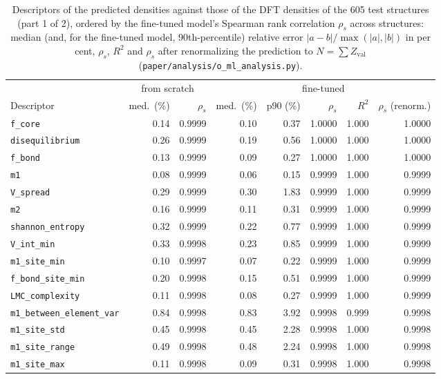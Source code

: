 \begin{table}[p]
\centering
\caption{Descriptors of the predicted densities against those of the DFT densities of the 605 test structures (part 1 of 2), ordered by the fine-tuned model's Spearman rank correlation $\rho_s$ across structures: median (and, for the fine-tuned model, 90th-percentile) relative error $|a-b|/\max(|a|,|b|)$ in per cent, $\rho_s$, $R^2$ and $\rho_s$ after renormalizing the prediction to $N=\sum Z_{\mathrm{val}}$ (\texttt{paper/analysis/o\_ml\_analysis.py}).}
\label{tab:si-ml}
\scriptsize
\begin{tabular}{lrrrrrrr}
\toprule
 & \multicolumn{2}{c}{from scratch} & \multicolumn{5}{c}{fine-tuned} \\
Descriptor & med.\ (\%) & $\rho_s$ & med.\ (\%) & p90 (\%) & $\rho_s$ & $R^2$ & $\rho_s$ (renorm.) \\
\midrule
\texttt{f\_core} & 0.14 & 0.9999 & 0.10 & 0.37 & 1.0000 & 1.000 & 1.0000 \\
\texttt{disequilibrium} & 0.26 & 0.9999 & 0.19 & 0.56 & 1.0000 & 1.000 & 1.0000 \\
\texttt{f\_bond} & 0.13 & 0.9999 & 0.09 & 0.27 & 1.0000 & 1.000 & 1.0000 \\
\texttt{m1} & 0.08 & 0.9999 & 0.06 & 0.15 & 0.9999 & 1.000 & 0.9999 \\
\texttt{V\_spread} & 0.29 & 0.9999 & 0.30 & 1.83 & 0.9999 & 1.000 & 0.9999 \\
\texttt{m2} & 0.16 & 0.9999 & 0.11 & 0.31 & 0.9999 & 1.000 & 0.9999 \\
\texttt{shannon\_entropy} & 0.32 & 0.9999 & 0.22 & 0.77 & 0.9999 & 1.000 & 0.9999 \\
\texttt{V\_int\_min} & 0.33 & 0.9998 & 0.23 & 0.85 & 0.9999 & 1.000 & 0.9999 \\
\texttt{m1\_site\_min} & 0.10 & 0.9997 & 0.07 & 0.22 & 0.9999 & 1.000 & 0.9999 \\
\texttt{f\_bond\_site\_min} & 0.20 & 0.9998 & 0.15 & 0.51 & 0.9999 & 1.000 & 0.9999 \\
\texttt{LMC\_complexity} & 0.11 & 0.9998 & 0.08 & 0.27 & 0.9999 & 1.000 & 0.9999 \\
\texttt{m1\_between\_element\_var} & 0.84 & 0.9998 & 0.83 & 3.92 & 0.9998 & 0.999 & 0.9998 \\
\texttt{m1\_site\_std} & 0.45 & 0.9998 & 0.45 & 2.28 & 0.9998 & 1.000 & 0.9998 \\
\texttt{m1\_site\_range} & 0.49 & 0.9998 & 0.48 & 2.24 & 0.9998 & 1.000 & 0.9998 \\
\texttt{m1\_site\_max} & 0.11 & 0.9998 & 0.09 & 0.31 & 0.9998 & 1.000 & 0.9998 \\

\end{tabular}
\end{table}

